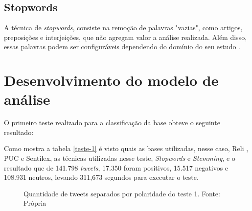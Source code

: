 \subsection{Stopwords}
A técnica de \textit{stopwords}, consiste na remoção de palavras "vazias", como artigos, preposições e interjeições, que não agregam valor a análise realizada. Além disso, essas palavras podem ser configuráveis dependendo do domínio do seu estudo  \cite{Rajaraman_Ullman_2011}.

\section{Desenvolvimento do modelo de análise}\label{sec:desenv-moda}
O primeiro teste realizado para a classificação da base obteve o seguinte resultado:
\begin{table}[]
	\caption{1º teste}
	\label{teste-1}
\end{table}

Como mostra a tabela \ref{teste-1} é visto quais as bases utilizadas, nesse caso, Reli , PUC e Sentilex, as técnicas utilizadas nesse teste, \textit{Stopwords} e \textit{Stemming}, e o resultado que de 141.798 \textit{tweets}, 17.350 foram positivos, 15.517 negativos e 108.931 neutros, levando 311,673 segundos para executar o teste.
\begin{figure}[!h]
	\centering{}
	\caption{Quantidade de tweets separados por polaridade do teste 1. Fonte: Própria}
	\label{teste-graf-1}
\end{figure}

